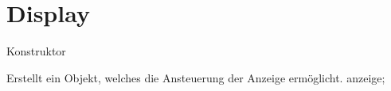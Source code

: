 \hypertarget{Display-example}{}\section{Display}
Konstruktor

Erstellt ein Objekt, welches die Ansteuerung der Anzeige ermöglicht. anzeige;


\begin{DoxyCodeInclude}
\end{DoxyCodeInclude}
 